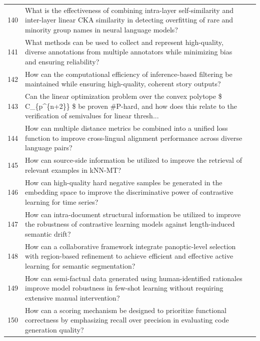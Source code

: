\begin{longtable}{@{}p{0.5cm}p{7.2cm}p{2.5cm}@{}}
140 & What is the effectiveness of combining intra-layer self-similarity and inter-layer linear CKA similarity in detecting overfitting of rare and minority group names in neural language models? & \cite{10.18653/v1/2021.emnlp-main.41} \\
141 & What methods can be used to collect and represent high-quality, diverse annotations from multiple annotators while minimizing bias and ensuring reliability? & \cite{10.1609/aaai.v37i6.25840} \\
142 & How can the computational efficiency of inference-based filtering be maintained while ensuring high-quality, coherent story outputs? & \cite{10.18653/v1/2022.findings-emnlp.520} \\
143 & Can the linear optimization problem over the convex polytope \$ C\_\{p\textasciicircum{}\{n+2\}\} \$ be proven \#P-hard, and how does this relate to the verification of semivalues for linear thresh... & \cite{10.1609/aaai.v33i01.33011869} \\
144 & How can multiple distance metrics be combined into a unified loss function to improve cross-lingual alignment performance across diverse language pairs? & \cite{10.18653/v1/2021.findings-acl.276} \\
145 & How can source-side information be utilized to improve the retrieval of relevant examples in kNN-MT? & \cite{10.18653/v1/2023.emnlp-main.503} \\
146 & How can high-quality hard negative samples be generated in the embedding space to improve the discriminative power of contrastive learning for time series? & \cite{10.1609/aaai.v38i12.29299} \\
147 & How can intra-document structural information be utilized to improve the robustness of contrastive learning models against length-induced semantic drift? & \cite{10.18653/v1/2023.emnlp-main.86} \\
148 & How can a collaborative framework integrate panoptic-level selection with region-based refinement to achieve efficient and effective active learning for semantic segmentation? & \cite{10.1609/aaai.v36i2.20107} \\
149 & How can semi-factual data generated using human-identified rationales improve model robustness in few-shot learning without requiring extensive manual intervention? & \cite{10.18653/v1/2022.acl-long.481} \\
150 & How can a scoring mechanism be designed to prioritize functional correctness by emphasizing recall over precision in evaluating code generation quality? & \cite{10.18653/v1/2023.emnlp-main.859} \\
\end{longtable}
